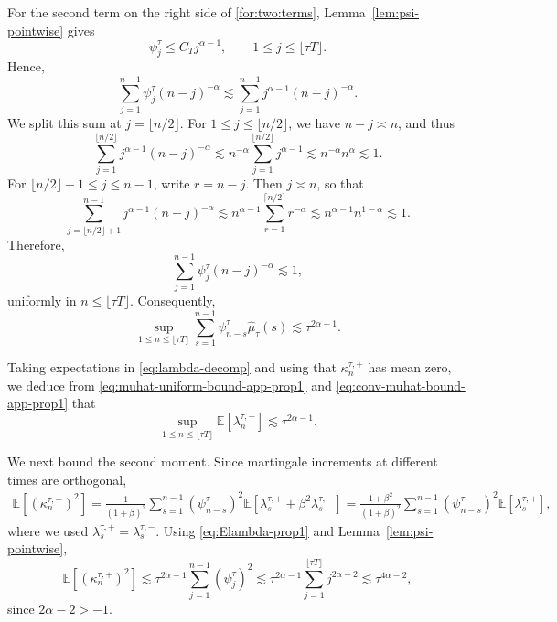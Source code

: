 \documentclass[letterpaper]{article}
\numberwithin{equation}{section}
\theoremstyle{definition}
\theoremstyle{remark}
\newcommand{\E}{\mathbb{E}}
\begin{document}
For the second term on the right side of \eqref{for:two:terms}, Lemma~\ref{lem:psi-pointwise} gives
\[
  \psi_j^\tau\le C_T j^{\alpha-1},
  \qquad 1\le j\le \lfloor \tau T\rfloor.
\]
Hence,
\[
  \sum_{j=1}^{n-1}\psi_j^\tau (n-j)^{-\alpha}
  \lesssim
  \sum_{j=1}^{n-1} j^{\alpha-1}(n-j)^{-\alpha}.
\]
We split this sum at $j=\lfloor n/2\rfloor$. For $1\le j\le \lfloor n/2\rfloor$,
we have $n-j\asymp n$, and thus
\[
  \sum_{j=1}^{\lfloor n/2\rfloor} j^{\alpha-1}(n-j)^{-\alpha}
  \lesssim
  n^{-\alpha}\sum_{j=1}^{\lfloor n/2\rfloor}j^{\alpha-1}
  \lesssim
  n^{-\alpha}n^\alpha
  \lesssim 1.
\]
For $\lfloor n/2\rfloor+1\le j\le n-1$, write $r=n-j$. Then $j\asymp n$, so that
\[
  \sum_{j=\lfloor n/2\rfloor+1}^{n-1} j^{\alpha-1}(n-j)^{-\alpha}
  \lesssim
  n^{\alpha-1}\sum_{r=1}^{\lceil n/2\rceil} r^{-\alpha}
  \lesssim
  n^{\alpha-1}n^{1-\alpha}
  \lesssim 1.
\]
Therefore,
\[
  \sum_{j=1}^{n-1}\psi_j^\tau (n-j)^{-\alpha}\lesssim 1,
\]
uniformly in $n\le \lfloor \tau T\rfloor$. Consequently,
\begin{equation}\label{eq:conv-muhat-bound-app-prop1}
  \sup_{1\le n\le \lfloor \tau T\rfloor}
  \sum_{s=1}^{n-1}\psi_{n-s}^\tau \hat\mu_\tau(s)
  \lesssim \tau^{2\alpha-1}.
\end{equation}

Taking expectations in \eqref{eq:lambda-decomp} and using that $\kappa_n^{\tau,+}$ has mean zero,
we deduce from \eqref{eq:muhat-uniform-bound-app-prop1} and
\eqref{eq:conv-muhat-bound-app-prop1} that
\begin{equation}\label{eq:Elambda-prop1}
  \sup_{1\le n\le \lfloor \tau T\rfloor}\E[\lambda_n^{\tau,+}]
  \lesssim \tau^{2\alpha-1}.
\end{equation}

We next bound the second moment. Since martingale increments at different times are orthogonal,
\begin{align*}
\E\!\left[\left(\kappa_n^{\tau,+}\right)^2\right]
  =
  \frac1{(1+\beta)^2}
  \sum_{s=1}^{n-1}(\psi_{n-s}^\tau)^2
  \E\!\left[
    \lambda_s^{\tau,+}+\beta^2\lambda_s^{\tau,-}
  \right]=
  \frac{1+\beta^2}{(1+\beta)^2}
  \sum_{s=1}^{n-1}(\psi_{n-s}^\tau)^2\E[\lambda_s^{\tau,+}],
\end{align*}
where we used $\lambda_s^{\tau,+}=\lambda_s^{\tau,-}$. Using \eqref{eq:Elambda-prop1} and
Lemma~\ref{lem:psi-pointwise},
\[
  \E\!\left[(\kappa_n^{\tau,+})^2\right]
  \lesssim
  \tau^{2\alpha-1}\sum_{j=1}^{n-1}(\psi_j^\tau)^2
  \lesssim
  \tau^{2\alpha-1}\sum_{j=1}^{\lfloor \tau T\rfloor}j^{2\alpha-2}
  \lesssim \tau^{4\alpha-2},
\]
since $2\alpha-2>-1$.
\end{document}
